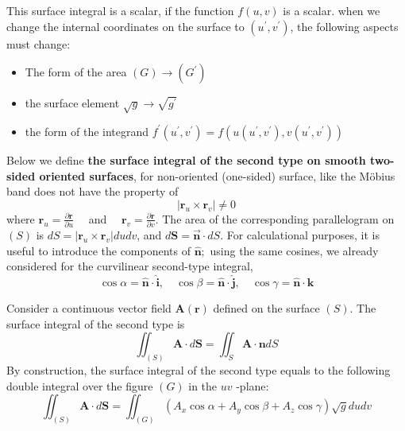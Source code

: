 This surface integral is a scalar, if the function $f(u,v)$ is a scalar. when we change the internal coordinates on the surface to $(u^{\prime},v^{\prime})$, the following aspects must change:
\begin{qt}
\begin{itemize}
    \item The form of the area $(G) \rightarrow\left(G^{\prime}\right)$
    \item the surface element $\sqrt{g} \rightarrow \sqrt{g^{\prime}}$
    \item the form of the integrand $f^{\prime}\left(u^{\prime}, v^{\prime}\right)=f\left(u\left(u^{\prime}, v^{\prime}\right), v\left(u^{\prime}, v^{\prime}\right)\right)$
\end{itemize}
\end{qt}
Below we define \textbf{the surface integral of the second type on smooth two-sided oriented surfaces}, for non-oriented (one-sided) surface, like the Möbius band does not have the property of
$$
\left|\mathbf{r}_{u} \times \mathbf{r}_{v}\right| \neq 0
$$
where $\mathbf{r}_{u}=\frac{\partial \mathbf{r}}{\partial u} \quad$ and $\quad \mathbf{r}_{v}=\frac{\partial \mathbf{r}}{\partial v}$. The area of the corresponding parallelogram on $(S)$ is $d S=\left|\mathbf{r}_{u} \times \mathbf{r}_{v}\right| d u d v$, and $d\mathbf{S}=\vec{\mathbf{n}}\cdot dS$. For calculational purposes, it is useful to introduce the components of $\hat{\mathbf{n}} ;$ using the same cosines, we already considered for the curvilinear second-type integral,
\begin{equation}
\cos \alpha=\hat{\mathbf{n}} \cdot \hat{\mathbf{i}}, \quad \cos \beta=\hat{\mathbf{n}} \cdot \hat{\mathbf{j}}, \quad \cos \gamma=\hat{\mathbf{n}} \cdot \hat{\mathbf{k}}
\end{equation}
\begin{defi}
         Consider a continuous vector field $\mathbf{A}(\mathbf{r})$ defined on the surface $(S) .$ The surface integral of the second type is
         \begin{equation}
\iint_{(S)} \mathbf{A} \cdot d \mathbf{S}=\iint_{S} \mathbf{A} \cdot \mathbf{n} d S
\end{equation}
By construction, the surface integral of the second type equals to the following double integral over the figure $(G)$ in the $u v$ -plane:
\begin{equation}
\iint_{(S)} \mathbf{A} \cdot d \mathbf{S}=\iint_{(G)}\left(A_{x} \cos \alpha+A_{y} \cos \beta+A_{z} \cos \gamma\right) \sqrt{g} d u d v
\end{equation}
\end{defi}

